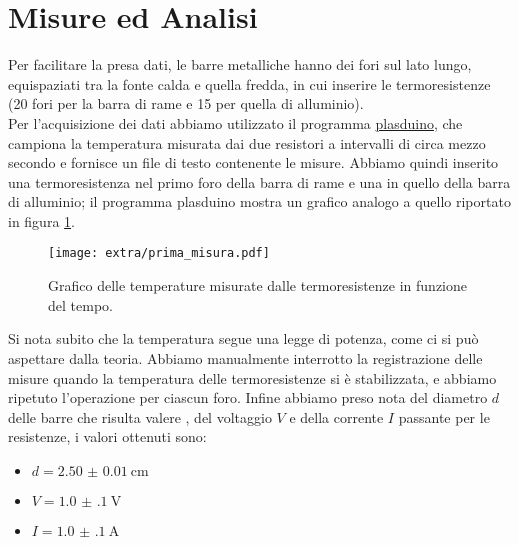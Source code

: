 \documentclass{article}
\begin{document}
    \section{Misure ed Analisi}
    Per facilitare la presa dati, le barre metalliche hanno dei fori sul lato lungo,
    equispaziati tra la fonte calda e quella fredda, in cui inserire le termoresistenze
    (20 fori per la barra di rame e 15 per quella di alluminio).\\
    Per l'acquisizione dei dati abbiamo utilizzato il programma \href{https://pythonhosted.org/plasduino/index.html}{plasduino},
    che campiona la temperatura misurata dai due resistori a intervalli di circa mezzo secondo
    e fornisce  un file di testo contenente le misure.
    Abbiamo quindi inserito una termoresistenza nel primo foro della barra di rame
    e una in quello della barra di alluminio; il programma plasduino mostra un grafico
    analogo a quello riportato in figura \ref{fig:prima_misura}.
    \begin{figure}[t]
        \centering
        \texttt{[image: extra/prima\_misura.pdf]}
        \caption{Grafico delle temperature misurate dalle termoresistenze in funzione del tempo.}
        \label{fig:prima_misura}
    \end{figure}
    Si nota subito che la temperatura segue una legge di potenza, come ci si può aspettare
    dalla teoria. Abbiamo manualmente interrotto la registrazione delle misure quando la
    temperatura delle termoresistenze si è stabilizzata, e abbiamo ripetuto l'operazione
    per ciascun foro.
    Infine abbiamo preso nota del diametro $d$ delle barre che risulta valere 
    , del voltaggio $V$ e della corrente $I$ passante per le resistenze,
    i valori ottenuti sono:
    \begin{itemize}
        \item $d=\SI{2.50(1)}{\cm}$
        \item $V=\SI{1.0(1)}{\volt}$
        \item $I=\SI{1.0(1)}{\ampere}$
    \end{itemize}
\end{document}
